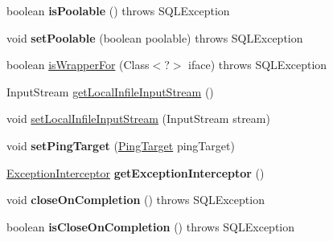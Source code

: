 \begin{DoxyCompactItemize}
\item 
\mbox{\label{classcom_1_1mysql_1_1jdbc_1_1_statement_impl_ac6dfa3e0b6a31fffb67fd49b0aeb5993}} 
boolean {\bfseries is\+Poolable} ()  throws S\+Q\+L\+Exception 
\item 
\mbox{\label{classcom_1_1mysql_1_1jdbc_1_1_statement_impl_afab7df887ecebff8ae325db8addd7e8f}} 
void {\bfseries set\+Poolable} (boolean poolable)  throws S\+Q\+L\+Exception 
\item 
boolean \mbox{\hyperlink{classcom_1_1mysql_1_1jdbc_1_1_statement_impl_a97ce8b90fd0b4404140b1fe9fbe3d3da}{is\+Wrapper\+For}} (Class$<$?$>$ iface)  throws S\+Q\+L\+Exception 
\item 
Input\+Stream \mbox{\hyperlink{classcom_1_1mysql_1_1jdbc_1_1_statement_impl_ad7895675e6a34d228fd058d2d4bd54cc}{get\+Local\+Infile\+Input\+Stream}} ()
\item 
void \mbox{\hyperlink{classcom_1_1mysql_1_1jdbc_1_1_statement_impl_ae2d3d7d72cfa5be301a49828f8bfa126}{set\+Local\+Infile\+Input\+Stream}} (Input\+Stream stream)
\item 
\mbox{\label{classcom_1_1mysql_1_1jdbc_1_1_statement_impl_a842b93105a4c8ece607ae1c850e8b610}} 
void {\bfseries set\+Ping\+Target} (\mbox{\hyperlink{interfacecom_1_1mysql_1_1jdbc_1_1_ping_target}{Ping\+Target}} ping\+Target)
\item 
\mbox{\label{classcom_1_1mysql_1_1jdbc_1_1_statement_impl_a77d736741a2b068403ef529c48ed62b4}} 
\mbox{\hyperlink{interfacecom_1_1mysql_1_1jdbc_1_1_exception_interceptor}{Exception\+Interceptor}} {\bfseries get\+Exception\+Interceptor} ()
\item 
\mbox{\label{classcom_1_1mysql_1_1jdbc_1_1_statement_impl_aa8f3eac0bdba013d673cf101ef3fcaed}} 
void {\bfseries close\+On\+Completion} ()  throws S\+Q\+L\+Exception 
\item 
\mbox{\label{classcom_1_1mysql_1_1jdbc_1_1_statement_impl_adf32ddb538f7ae52913015183d4d085a}} 
boolean {\bfseries is\+Close\+On\+Completion} ()  throws S\+Q\+L\+Exception 
\item 

\end{DoxyCompactItemize}
